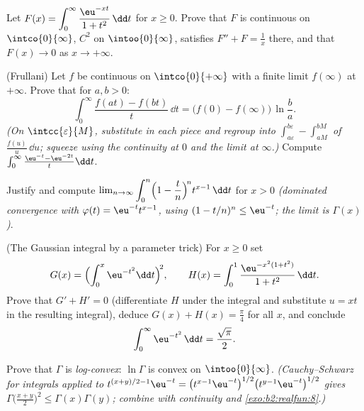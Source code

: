 \begin{exercise}[$\star\star$]\label{exo:b2:integration:5}
Let $F(x) = \displaystyle\int_0^{\infty} \frac{\eu^{-xt}}{1 +
t^2}\,\dd t$ for $x \geq 0$. Prove that $F$ is continuous on
$\intco{0}{\infty}$, $C^2$ on $\intoo{0}{\infty}$, satisfies $F'' +
F = \frac1x$ there, and that $F(x) \to 0$ as $x \to +\infty$.
\end{exercise}

\begin{exercise}[$\star\star$]\label{exo:b2:integration:6}
(Frullani) Let $f$ be continuous on $\intco{0}{+\infty}$ with a
finite limit $f(\infty)$ at $+\infty$. Prove that for $a, b > 0$:
\[
\int_0^{\infty} \frac{f(at) - f(bt)}{t}\,\dd t
= \bigl(f(0) - f(\infty)\bigr)\,\ln\frac ba .
\]
\emph{(On $\intcc{\varepsilon}{M}$, substitute in each piece and
regroup into $\int_{a\varepsilon}^{b\varepsilon} -
\int_{aM}^{bM}$ of $\frac{f(u)}u\,\dd u$; squeeze using the
continuity at $0$ and the limit at $\infty$.)} Compute
$\int_0^\infty \frac{\eu^{-t} - \eu^{-2t}}{t}\dd t$.
\end{exercise}

\begin{exercise}[$\star\star$]\label{exo:b2:integration:7}
Justify and compute $\lim_{n\to\infty} \displaystyle\int_0^n
\Bigl(1 - \frac tn\Bigr)^{\!n} t^{x-1}\,\dd t$ for $x > 0$
\emph{(dominated convergence with $\varphi(t) = \eu^{-t}t^{x-1}$,
using $(1 - t/n)^n \leq \eu^{-t}$; the limit is $\Gamma(x)$)}.
\end{exercise}

\begin{exercise}[$\star\star\star$]\label{exo:b2:integration:8}
(The Gaussian integral by a parameter trick) For $x \geq 0$ set
\[
G(x) = \Bigl(\int_0^x \eu^{-t^2}\dd t\Bigr)^{\!2},
\qquad
H(x) = \int_0^1 \frac{\eu^{-x^2(1+t^2)}}{1 + t^2}\,\dd t .
\]
Prove that $G' + H' = 0$ (differentiate $H$ under the integral and
substitute $u = xt$ in the resulting integral), deduce $G(x) + H(x)
= \frac\pi4$ for all $x$, and conclude
\[
\int_0^{\infty} \eu^{-t^2}\,\dd t = \frac{\sqrt\pi}{2} .
\]
\end{exercise}

\begin{exercise}[$\star\star\star$]\label{exo:b2:integration:9}
Prove that $\Gamma$ is \emph{log-convex}: $\ln\Gamma$ is convex on
$\intoo{0}{\infty}$. \emph{(Cauchy--Schwarz for integrals applied
to $t^{(x+y)/2 - 1}\eu^{-t} = \bigl(t^{x-1}\eu^{-t}\bigr)^{1/2}
\bigl(t^{y-1}\eu^{-t}\bigr)^{1/2}$ gives
$\Gamma\bigl(\frac{x+y}{2}\bigr)^2 \leq \Gamma(x)\Gamma(y)$;
combine with continuity and \cref{exo:b2:realfun:8}.)}
\end{exercise}

